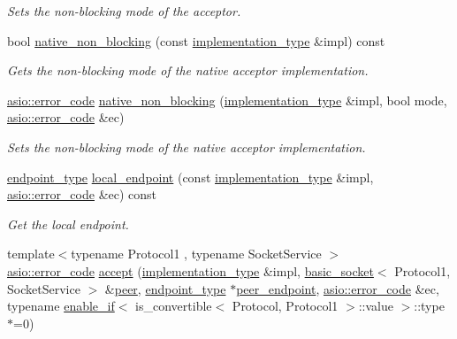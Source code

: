 \begin{DoxyCompactItemize}
\begin{DoxyCompactList}\small\item\em Sets the non-\/blocking mode of the acceptor. \end{DoxyCompactList}\item 
bool \hyperlink{classasio_1_1socket__acceptor__service_a3e3e6cb2438e24cec4f39347ce2d6310}{native\+\_\+non\+\_\+blocking} (const \hyperlink{classasio_1_1socket__acceptor__service_ae91b355a38c59424f68df71fcd9fffb8}{implementation\+\_\+type} \&impl) const 
\begin{DoxyCompactList}\small\item\em Gets the non-\/blocking mode of the native acceptor implementation. \end{DoxyCompactList}\item 
\hyperlink{classasio_1_1error__code}{asio\+::error\+\_\+code} \hyperlink{classasio_1_1socket__acceptor__service_afb63c7dc48b737504e4474917a310d62}{native\+\_\+non\+\_\+blocking} (\hyperlink{classasio_1_1socket__acceptor__service_ae91b355a38c59424f68df71fcd9fffb8}{implementation\+\_\+type} \&impl, bool mode, \hyperlink{classasio_1_1error__code}{asio\+::error\+\_\+code} \&ec)
\begin{DoxyCompactList}\small\item\em Sets the non-\/blocking mode of the native acceptor implementation. \end{DoxyCompactList}\item 
\hyperlink{classasio_1_1socket__acceptor__service_a2e266541d8da5db4af397b4a62bc3923}{endpoint\+\_\+type} \hyperlink{classasio_1_1socket__acceptor__service_af8d65c7d64cdddade3733497bf4d6932}{local\+\_\+endpoint} (const \hyperlink{classasio_1_1socket__acceptor__service_ae91b355a38c59424f68df71fcd9fffb8}{implementation\+\_\+type} \&impl, \hyperlink{classasio_1_1error__code}{asio\+::error\+\_\+code} \&ec) const 
\begin{DoxyCompactList}\small\item\em Get the local endpoint. \end{DoxyCompactList}\item 
{\footnotesize template$<$typename Protocol1 , typename Socket\+Service $>$ }\\\hyperlink{classasio_1_1error__code}{asio\+::error\+\_\+code} \hyperlink{classasio_1_1socket__acceptor__service_a6b9393c9a3efe8b45f7ededb5cb52b51}{accept} (\hyperlink{classasio_1_1socket__acceptor__service_ae91b355a38c59424f68df71fcd9fffb8}{implementation\+\_\+type} \&impl, \hyperlink{classasio_1_1basic__socket}{basic\+\_\+socket}$<$ Protocol1, Socket\+Service $>$ \&\hyperlink{classasio_1_1socket__acceptor__service_aca6046131e63a54ab7c85cea721d4c53}{peer}, \hyperlink{classasio_1_1socket__acceptor__service_a2e266541d8da5db4af397b4a62bc3923}{endpoint\+\_\+type} $\ast$\hyperlink{classasio_1_1socket__acceptor__service_a680888264a952847bd9942de4444e183}{peer\+\_\+endpoint}, \hyperlink{classasio_1_1error__code}{asio\+::error\+\_\+code} \&ec, typename \hyperlink{structasio_1_1enable__if}{enable\+\_\+if}$<$ is\+\_\+convertible$<$ Protocol, Protocol1 $>$\+::value $>$\+::type $\ast$=0)

\end{DoxyCompactItemize}
